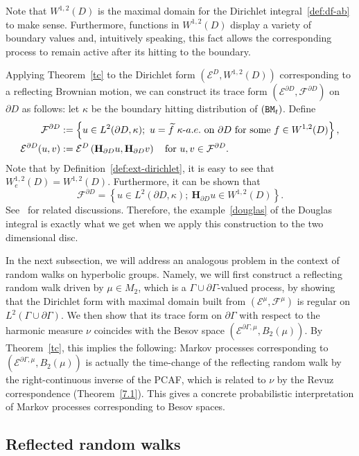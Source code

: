 \documentclass[AHL,Unicode,longabstracts,published]{cedram}
\newcommand{\ce}{\mathcal{E}}
\newcommand{\cf}{\mathcal{F}}
\newcommand{\bfH}{\mathbf{H}}
\let\oldtilde\tilde
\renewcommand*{\tilde}[1]{\mathchoice{\widetilde{#1}}{\widetilde{#1}}{\oldtilde{#1}}{\oldtilde{#1}}}
\begin{document}
Note that $W^{1,2}(D)$ is the maximal domain for the Dirichlet integral~\eqref{def:df-ab} to make sense. Furthermore, functions in $W^{1,2}(D)$ display a variety of boundary values and, intuitively speaking, this fact allows the corresponding process to remain active after its hitting to the boundary.

Applying Theorem~\ref{tc} to the Dirichlet form $(\ce^D, W^{1,2}(D))$ corresponding to a reflecting Brownian motion, we can construct its trace form $(\ce^{\partial D},
\cf^{\partial D})$ on $\partial D$ as follows: let $\kappa$ be the boundary hitting distribution of $({\tt BM}_t)$. Define
\begin{align}\label{eq:trace-bm}
\cf^{\partial D}&:=\left\{u\in L^2(\partial D,\kappa);\ u=\tilde{f}\ \kappa\text{-}a.e.\ \text{on}\ \partial D\ \text{for some}\ f\in W^{1,2}(D)\right\},\\
\ce^{\partial D}(u,v)&:=\ce^{D}\left(\bfH_{\partial D}u,\bfH_{\partial D}v\right)\quad\text{for}\ u,v\in \cf^{\partial D}.
\end{align}
Note that by Definition~\ref{def:ext-dirichlet}, it is easy to see that $W_e^{1,2}(D)=W^{1,2}(D)$. Furthermore, it can be shown that
\[
\cf^{\partial D}=\left\{u\in L^2(\partial D,\kappa);\ \bfH_{\partial D}u\in W^{1,2}(D)\right\}.
\]
See~\cite[Section~7.2, Example~7.2.10]{CF} for related discussions. Therefore, the example~\eqref{douglas} of the Douglas integral is exactly what we get when we apply this construction to the two dimensional disc.

In the next subsection, we will address an analogous problem in the context of random walks on hyperbolic groups. Namely, we will first construct a reflecting random walk driven by $\mu\in M_2$, which is a $\Gamma\cup\partial\Gamma$-valued process, by showing that the Dirichlet form with maximal domain built from $(\ce^\mu,\cf^\mu)$ is regular on $L^2(\Gamma\cup\partial\Gamma)$. We then show that its trace form on $\partial\Gamma$ with respect to the harmonic measure $\nu$ coincides with the Besov space $(\ce^{\partial\Gamma,\mu},B_2(\mu))$. By Theorem~\ref{tc}, this implies the following: Markov processes corresponding to $(\ce^{\partial\Gamma,\mu},B_2(\mu))$ is actually the time-change of the reflecting random walk by the right-continuous inverse of the PCAF, which is related to $\nu$ by the Revuz correspondence (Theorem~\ref{7.1}). This gives a concrete probabilistic interpretation of Markov processes corresponding to Besov spaces.

\subsection{Reflected random walks}
\end{document}
